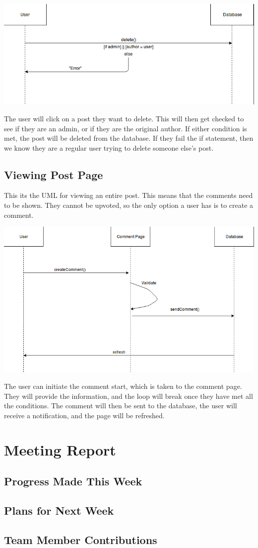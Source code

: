 \documentclass[12pt]{article}
\begin{document}
\includegraphics{img/audit}

The user will click on a post they want to delete. This will then get checked to see if they are an admin, or if they are the original author. If either condition is met, the post will be deleted from the database. If they fail the if statement, then we know they are a regular user trying to delete someone else’s post. 
\subsection{Viewing Post Page}
This its the UML for viewing an entire post. This means that the comments need to be shown. They cannot be upvoted, so the only option a user has is to create a comment.

\includegraphics[scale=0.85]{img/createComment}

The user can initiate the comment start, which is taken to the comment page. They will provide the information, and the loop will break once they have met all the conditions. The comment will then be sent to the database, the user will receive a notification, and the page will be refreshed.

\section{Meeting Report}

\subsection{Progress Made This Week}
\subsection{Plans for Next Week}
\subsection{Team Member Contributions}
\end{document}
